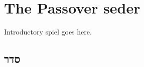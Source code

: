 \documentclass[a4paper,10pt,openany]{memoir}
\newcommand{\hchapter}[1]{
  \begin{otherlanguage}{hebrew}
    \chapter*{#1}
  \end{otherlanguage}
}
\begin{document}
%
%
%

\chapter*{The Passover seder}

Introductory spiel goes here.

\hchapter{סדר}
\end{document}
